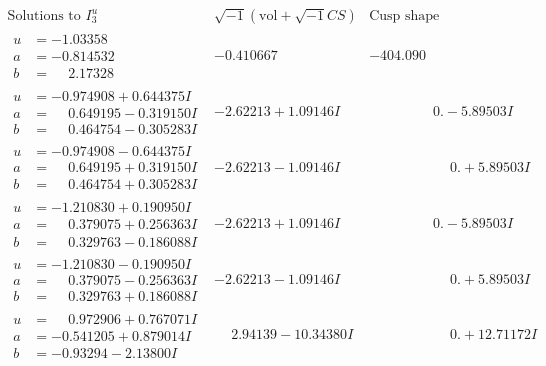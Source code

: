 \documentclass[1p]{elsarticle_modified}
\theoremstyle{definition}
\newcommand{\I}{\sqrt{-1}}
\begin{document}
$$\begin{array}{c|c|c}  
\text{Solutions to }I^u_{3}& \I (\text{vol} + \sqrt{-1}CS) & \text{Cusp shape}\\
 \hline 
\begin{aligned}
u &= -1.03358\phantom{ +0.000000I} \\
a &= -0.814532\phantom{ +0.000000I} \\
b &= \phantom{-}2.17328\phantom{ +0.000000I}\end{aligned}
 & -0.410667\phantom{ +0.000000I} & -404.090\phantom{ +0.000000I} \\ \hline\begin{aligned}
u &= -0.974908 + 0.644375 I \\
a &= \phantom{-}0.649195 - 0.319150 I \\
b &= \phantom{-}0.464754 - 0.305283 I\end{aligned}
 & -2.62213 + 1.09146 I & \phantom{-0.000000 } 0. - 5.89503 I \\ \hline\begin{aligned}
u &= -0.974908 - 0.644375 I \\
a &= \phantom{-}0.649195 + 0.319150 I \\
b &= \phantom{-}0.464754 + 0.305283 I\end{aligned}
 & -2.62213 - 1.09146 I & \phantom{-0.000000 -}0. + 5.89503 I \\ \hline\begin{aligned}
u &= -1.210830 + 0.190950 I \\
a &= \phantom{-}0.379075 + 0.256363 I \\
b &= \phantom{-}0.329763 - 0.186088 I\end{aligned}
 & -2.62213 + 1.09146 I & \phantom{-0.000000 } 0. - 5.89503 I \\ \hline\begin{aligned}
u &= -1.210830 - 0.190950 I \\
a &= \phantom{-}0.379075 - 0.256363 I \\
b &= \phantom{-}0.329763 + 0.186088 I\end{aligned}
 & -2.62213 - 1.09146 I & \phantom{-0.000000 -}0. + 5.89503 I \\ \hline\begin{aligned}
u &= \phantom{-}0.972906 + 0.767071 I \\
a &= -0.541205 + 0.879014 I \\
b &= -0.93294 - 2.13800 I\end{aligned}
 & \phantom{-}2.94139 - 10.34380 I & \phantom{-0.000000 -}0. + 12.71172 I \\ \hline\begin{aligned}

\end{aligned}
\end{array}$$
\end{document}
